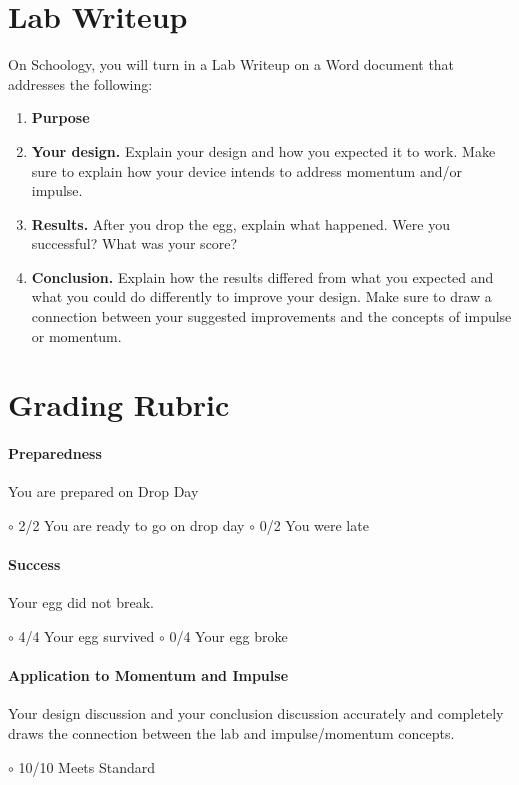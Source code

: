 \documentclass[10pt]{exam}
\begin{document}
\section*{Lab Writeup}

On Schoology, you will turn in a Lab Writeup on a Word document that addresses the following:


\begin{enumerate}
  \item {\bf Purpose}
  \item {\bf Your design.} Explain your design and how you expected it to work.  Make sure to explain how your device intends to address momentum and/or impulse.
  \item {\bf Results.} After you drop the egg, explain what happened. Were you successful? What was your score?
  \item {\bf Conclusion.}  Explain how the results differed from what you expected and what you could do differently to improve your design.  Make sure to draw a connection between your suggested improvements and the concepts of impulse or momentum.
\end{enumerate}


\section*{Grading Rubric}

\paragraph{Preparedness}  You are prepared on Drop Day
 
$\circ$ 2/2 You are ready to go on drop day \hfill
$\circ$ 0/2 You were late \hfill{}

\paragraph{Success}  Your egg did not break.
 
$\circ$ 4/4 Your egg survived \hfill
$\circ$ 0/4 Your egg broke \hfill{}

\paragraph{Application to Momentum and Impulse} Your design discussion and your conclusion discussion accurately and completely draws the connection between the lab and impulse/momentum concepts.

$\circ$ 10/10 Meets Standard \hfill
\end{document}
